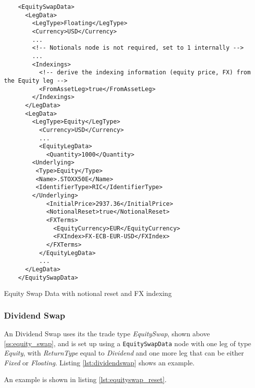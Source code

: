 \begin{listing}[H]
\begin{verbatim}
    <EquitySwapData>
      <LegData>
        <LegType>Floating</LegType>
        <Currency>USD</Currency>
        ...
        <!-- Notionals node is not required, set to 1 internally -->
        ...
        <Indexings>
          <!-- derive the indexing information (equity price, FX) from the Equity leg -->
          <FromAssetLeg>true</FromAssetLeg>
        </Indexings>
      </LegData>
      <LegData>
        <LegType>Equity</LegType>
          <Currency>USD</Currency>
          ...
          <EquityLegData>
            <Quantity>1000</Quantity>
		<Underlying>
		 <Type>Equity</Type>
		 <Name>.STOXX50E</Name>
		 <IdentifierType>RIC</IdentifierType>
		</Underlying>
            <InitialPrice>2937.36</InitialPrice>
            <NotionalReset>true</NotionalReset>
            <FXTerms>
              <EquityCurrency>EUR</EquityCurrency>
              <FXIndex>FX-ECB-EUR-USD</FXIndex>
            </FXTerms>
          </EquityLegData>
          ...
      </LegData>
    </EquitySwapData>
\end{verbatim}
\caption{Equity Swap Data with notional reset and FX indexing}
\label{lst:equityswap_reset}
\end{listing}

\subsubsection{Dividend Swap}
\label{ss:dividend_swap}

An Dividend Swap uses its the trade type \emph{EquitySwap}, shown above \ref{ss:equity_swap}, and is set up using a {\tt EquitySwapData} node with one leg of type  \emph{Equity}, with \emph{ReturnType} equal to \emph{Dividend} and one more leg that can be either \emph{Fixed} or  \emph{Floating}. Listing \ref{lst:dividendswap} shows an example.

An example is shown in listing \ref{lst:equityswap_reset}.

